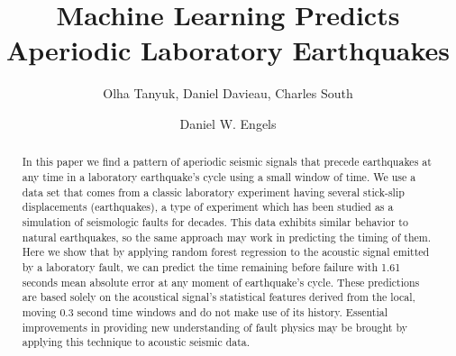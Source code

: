 \documentclass[]{llncs} %
\begin{document}

\title{Machine Learning Predicts Aperiodic Laboratory Earthquakes}
\author{Olha Tanyuk, Daniel Davieau, Charles South \and Daniel W. Engels}


\maketitle
\begin{abstract}
In this paper we find a pattern of aperiodic seismic signals that precede earthquakes at any time in a laboratory earthquake’s cycle using a small window of time.  We use a data set that comes from a classic laboratory experiment having several stick-slip displacements (earthquakes), a type of experiment which has been studied as a simulation of seismologic faults for decades. This data exhibits similar behavior to natural earthquakes, so the same approach may work in predicting the timing of them. Here we show that by applying random forest regression to the acoustic signal emitted by a laboratory fault, we can predict the time remaining before failure with 1.61 seconds mean absolute error at any moment of earthquake’s cycle. These predictions are based solely on the acoustical signal's statistical features derived from the local, moving 0.3 second time windows and do not make use of its history. Essential improvements in providing new understanding of fault physics may be brought by applying this technique to acoustic seismic data.\par


\end{abstract}
\end{document}
